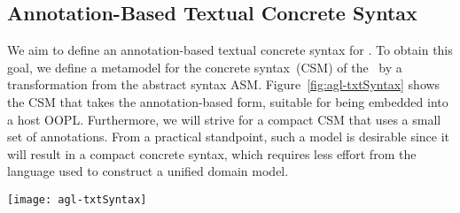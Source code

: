 
\subsection{Annotation-Based Textual Concrete Syntax} 
\label{subsect:agl-textual}

We aim to define an annotation-based textual concrete syntax for \agl. To obtain this goal, we define a metamodel for the concrete syntax~(CSM) of the \agl~by a transformation from the abstract syntax ASM. Figure~\ref{fig:agl-txtSyntax} shows the CSM that takes the annotation-based form, suitable for being embedded into a host OOPL. Furthermore, we will strive for a compact CSM that uses a small set of annotations. From a practical standpoint, such a model is desirable since it will result in a compact concrete syntax, which requires less effort from the language used to construct a unified domain model.

\begin{figure*}[ht]
	\begin{center}
		\texttt{[image: agl-txtSyntax]}
	\end{center}
	\vspace{-0.5cm}
	\caption{Illustration for AGL's annotation-based textual concrete syntax, realized in Java.} %
	\label{fig:agl-txtSyntax}
\end{figure*}

